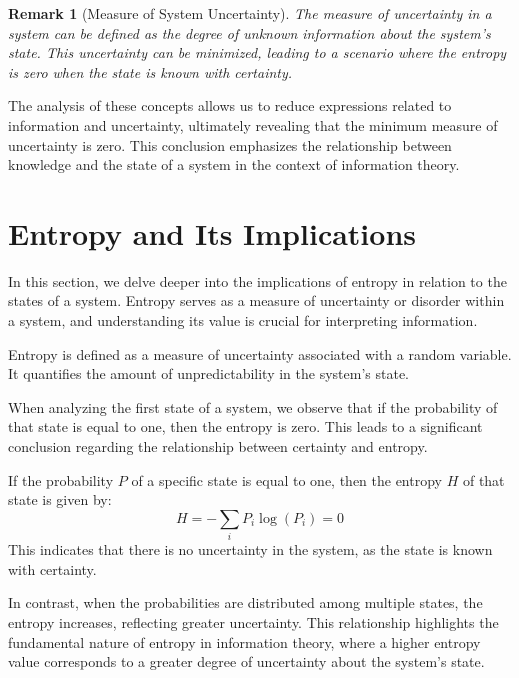 \documentclass[12pt,a4paper]{article}
\newenvironment{thmbox}[1][]{%
  \begin{tcolorbox}[enhanced, breakable, colback=thmcolor, colframe=blue!50!black, title=#1, fonttitle=\bfseries, arc=3pt, boxrule=0.5pt]
}{\end{tcolorbox}}
\newenvironment{defbox}[1][]{%
  \begin{tcolorbox}[enhanced, breakable, colback=defcolor, colframe=green!50!black, title=#1, fonttitle=\bfseries, arc=3pt, boxrule=0.5pt]
}{\end{tcolorbox}}
\newtheorem{remark}{Remark}[section]
\begin{document}
\begin{remark}[Measure of System Uncertainty]
The measure of uncertainty in a system can be defined as the degree of unknown information about the system's state. This uncertainty can be minimized, leading to a scenario where the entropy is zero when the state is known with certainty.
\end{remark}

The analysis of these concepts allows us to reduce expressions related to information and uncertainty, ultimately revealing that the minimum measure of uncertainty is zero. This conclusion emphasizes the relationship between knowledge and the state of a system in the context of information theory.

\section{Entropy and Its Implications}
In this section, we delve deeper into the implications of entropy in relation to the states of a system. Entropy serves as a measure of uncertainty or disorder within a system, and understanding its value is crucial for interpreting information.

\begin{defbox}[Entropy]
Entropy is defined as a measure of uncertainty associated with a random variable. It quantifies the amount of unpredictability in the system's state.
\end{defbox}

When analyzing the first state of a system, we observe that if the probability of that state is equal to one, then the entropy is zero. This leads to a significant conclusion regarding the relationship between certainty and entropy.

\begin{thmbox}[Entropy of Certain State]
If the probability \( P \) of a specific state is equal to one, then the entropy \( H \) of that state is given by:
\begin{equation}
H = -\sum_{i} P_i \log(P_i) = 0
\end{equation}
This indicates that there is no uncertainty in the system, as the state is known with certainty.
\end{thmbox}

In contrast, when the probabilities are distributed among multiple states, the entropy increases, reflecting greater uncertainty. This relationship highlights the fundamental nature of entropy in information theory, where a higher entropy value corresponds to a greater degree of uncertainty about the system's state.
\end{document}
